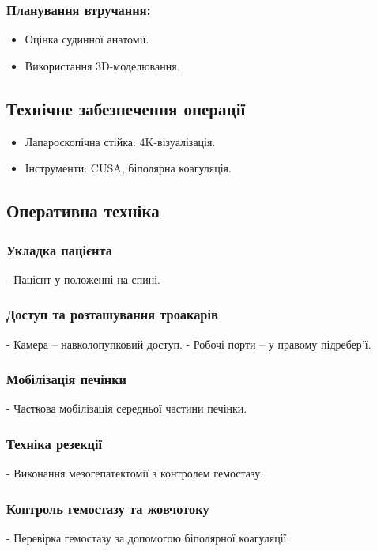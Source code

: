 \begin{refsection}
\subsubsection{Планування втручання:}
\begin{itemize}
    \item Оцінка судинної анатомії.
    \item Використання 3D-моделювання.
\end{itemize}

\subsection{Технічне забезпечення операції}
\begin{itemize}
    \item Лапароскопічна стійка: 4K-візуалізація.
    \item Інструменти: CUSA, біполярна коагуляція.
\end{itemize}

\subsection{Оперативна техніка}
\subsubsection{Укладка пацієнта}
- Пацієнт у положенні на спині.

\subsubsection{Доступ та розташування троакарів}
- Камера – навколопупковий доступ.
- Робочі порти – у правому підребер'ї.

\subsubsection{Мобілізація печінки}
- Часткова мобілізація середньої частини печінки.

\subsubsection{Техніка резекції}
- Виконання мезогепатектомії з контролем гемостазу.

\subsubsection{Контроль гемостазу та жовчотоку}
- Перевірка гемостазу за допомогою біполярної коагуляції.


\end{refsection}
